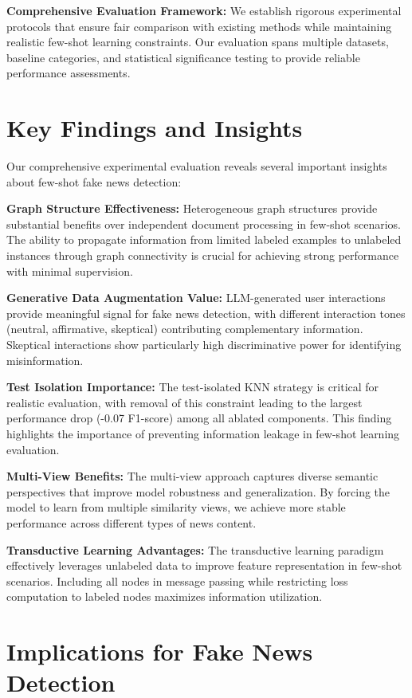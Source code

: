 \textbf{Comprehensive Evaluation Framework:} We establish rigorous experimental protocols that ensure fair comparison with existing methods while maintaining realistic few-shot learning constraints. Our evaluation spans multiple datasets, baseline categories, and statistical significance testing to provide reliable performance assessments.

\section{Key Findings and Insights}

Our comprehensive experimental evaluation reveals several important insights about few-shot fake news detection:

\textbf{Graph Structure Effectiveness:} Heterogeneous graph structures provide substantial benefits over independent document processing in few-shot scenarios. The ability to propagate information from limited labeled examples to unlabeled instances through graph connectivity is crucial for achieving strong performance with minimal supervision.

\textbf{Generative Data Augmentation Value:} LLM-generated user interactions provide meaningful signal for fake news detection, with different interaction tones (neutral, affirmative, skeptical) contributing complementary information. Skeptical interactions show particularly high discriminative power for identifying misinformation.

\textbf{Test Isolation Importance:} The test-isolated KNN strategy is critical for realistic evaluation, with removal of this constraint leading to the largest performance drop (-0.07 F1-score) among all ablated components. This finding highlights the importance of preventing information leakage in few-shot learning evaluation.

\textbf{Multi-View Benefits:} The multi-view approach captures diverse semantic perspectives that improve model robustness and generalization. By forcing the model to learn from multiple similarity views, we achieve more stable performance across different types of news content.

\textbf{Transductive Learning Advantages:} The transductive learning paradigm effectively leverages unlabeled data to improve feature representation in few-shot scenarios. Including all nodes in message passing while restricting loss computation to labeled nodes maximizes information utilization.

\section{Implications for Fake News Detection}

